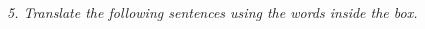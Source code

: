 \documentclass{exam}
\begin{document}
\noindent \textit{5. Translate the following sentences using the words inside the box.}

\begin{CJK*}{UTF8}{gbsn}
%
%
%
%
%
%
%
%
%
%
%
%
%
%
%
%
%
%
%
%
\end{CJK*}


%
%
%
%
%
%
%
%
%
%
%
%
%
%
%
%
%
%
%
%



%
%
%
%
%
%
%
%
%
%
%
%
%
%
%
%
%
%
%
%
\end{document}
